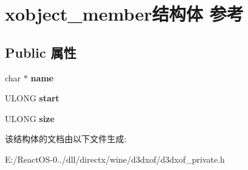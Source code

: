 \hypertarget{structxobject__member}{}\section{xobject\+\_\+member结构体 参考}
\label{structxobject__member}
\subsection*{Public 属性}
\begin{DoxyCompactItemize}
\item 
\mbox{\label{structxobject__member_a99acc6d863eaa03ae921b551a4fa1591}} 
char $\ast$ {\bfseries name}
\item 
\mbox{\label{structxobject__member_acb68c7f9659c3def9e97a4b146d11110}} 
U\+L\+O\+NG {\bfseries start}
\item 
\mbox{\label{structxobject__member_a25b3a1fe4e87ff3c8b02692320836ce6}} 
U\+L\+O\+NG {\bfseries size}
\end{DoxyCompactItemize}


该结构体的文档由以下文件生成\+:\begin{DoxyCompactItemize}
\item 
E\+:/\+React\+O\+S-\/0../dll/directx/wine/d3dxof/d3dxof\+\_\+private.\+h\end{DoxyCompactItemize}

